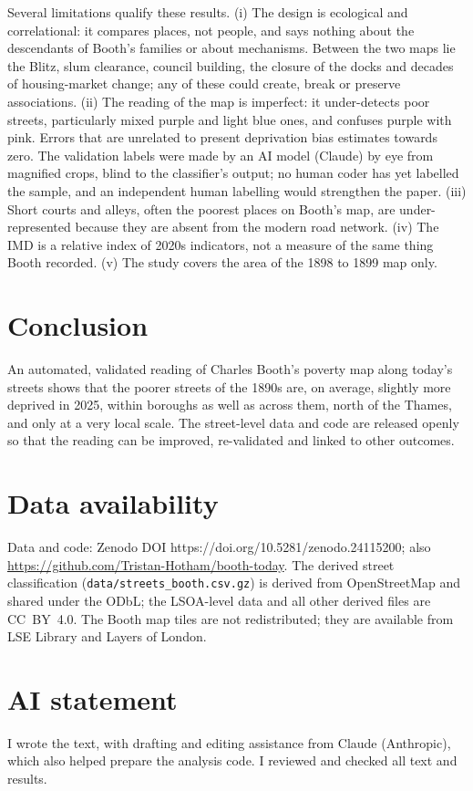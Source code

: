 \documentclass[11pt,a4paper]{article}
\begin{document}
Several limitations qualify these results. (i) The design is ecological and correlational: it compares places, not people, and says nothing about the descendants of Booth's families or about mechanisms. Between the two maps lie the Blitz, slum clearance, council building, the closure of the docks and decades of housing-market change; any of these could create, break or preserve associations. (ii) The reading of the map is imperfect: it under-detects poor streets, particularly mixed purple and light blue ones, and confuses purple with pink. Errors that are unrelated to present deprivation bias estimates towards zero. The validation labels were made by an AI model (Claude) by eye from magnified crops, blind to the classifier's output; no human coder has yet labelled the sample, and an independent human labelling would strengthen the paper. (iii) Short courts and alleys, often the poorest places on Booth's map, are under-represented because they are absent from the modern road network. (iv) The IMD is a relative index of 2020s indicators, not a measure of the same thing Booth recorded. (v) The study covers the area of the 1898 to 1899 map only.

\section{Conclusion}\label{sec:conclusion}

An automated, validated reading of Charles Booth's poverty map along today's streets shows that the poorer streets of the 1890s are, on average, slightly more deprived in 2025, within boroughs as well as across them, north of the Thames, and only at a very local scale. The street-level data and code are released openly so that the reading can be improved, re-validated and linked to other outcomes.

\section*{Data availability}
Data and code: Zenodo DOI https://doi.org/10.5281/zenodo.24115200; also \url{https://github.com/Tristan-Hotham/booth-today}. The derived street classification (\texttt{data/streets\_booth.csv.gz}) is derived from OpenStreetMap and shared under the ODbL; the LSOA-level data and all other derived files are CC~BY~4.0. The Booth map tiles are not redistributed; they are available from LSE Library and Layers of London.

\section*{AI statement}
I wrote the text, with drafting and editing assistance from Claude (Anthropic), which also helped prepare the analysis code. I reviewed and checked all text and results.
\end{document}
